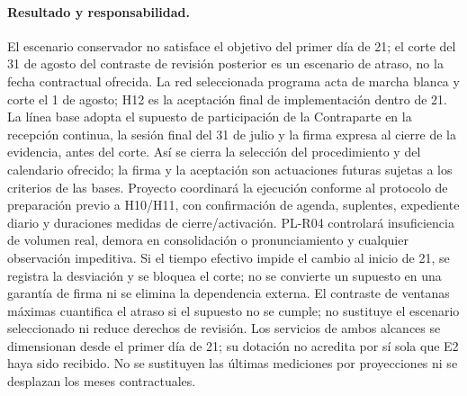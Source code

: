 \paragraph{Resultado y responsabilidad.} El escenario conservador no satisface el objetivo del primer día de 21; el corte del 31 de agosto del contraste de revisión posterior es un escenario de atraso, no la fecha contractual ofrecida. La red seleccionada programa acta de marcha blanca y corte el 1 de agosto; H12 es la aceptación final de implementación dentro de 21. La línea base adopta el supuesto de participación de la Contraparte en la recepción continua, la sesión final del 31 de julio y la firma expresa al cierre de la evidencia, antes del corte. Así se cierra la selección del procedimiento y del calendario ofrecido; la firma y la aceptación son actuaciones futuras sujetas a los criterios de las bases. Proyecto coordinará la ejecución conforme al protocolo de preparación previo a H10/H11, con confirmación de agenda, suplentes, expediente diario y duraciones medidas de cierre/activación. PL-R04 controlará insuficiencia de volumen real, demora en consolidación o pronunciamiento y cualquier observación impeditiva. Si el tiempo efectivo impide el cambio al inicio de 21, se registra la desviación y se bloquea el corte; no se convierte un supuesto en una garantía de firma ni se elimina la dependencia externa. El contraste de ventanas máximas cuantifica el atraso si el supuesto no se cumple; no sustituye el escenario seleccionado ni reduce derechos de revisión. Los servicios de ambos alcances se dimensionan desde el primer día de 21; su dotación no acredita por sí sola que E2 haya sido recibido. No se sustituyen las últimas mediciones por proyecciones ni se desplazan los meses contractuales.~\parencite[arts.~17--18; pp.~12--13]{bases-admin}
